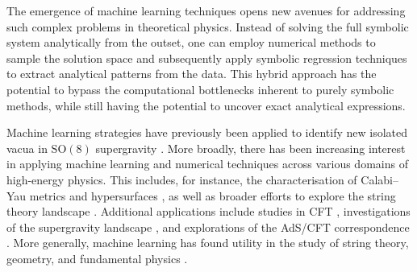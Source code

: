 \documentclass[11pt,a4paper]{article}
\begin{document}
The emergence of machine learning techniques opens new avenues for addressing such complex problems in theoretical physics. Instead of solving the full symbolic system analytically from the outset, one can employ numerical methods to sample the solution space and subsequently apply symbolic regression techniques to extract analytical patterns from the data. This hybrid approach has the potential to bypass the computational bottlenecks inherent to purely symbolic methods, while still having the potential to uncover exact analytical expressions.

Machine learning strategies have previously been applied to identify new isolated vacua in $\mathrm{SO}(8)$ supergravity \cite{Comsa:2019rcz,Berman:2022jqn}. More broadly, there has been increasing interest in applying machine learning and numerical techniques across various domains of high-energy physics. This includes, for instance, the characterisation of Calabi–Yau metrics and hypersurfaces \cite{Ashmore:2019wzb,Berman:2021mcw,Larfors:2022nep,Berglund:2022gvm,Jejjala:2020wcc,Douglas:2006rr,Larfors:2021pbb,He:2018jtw}, as well as broader efforts to explore the string theory landscape \cite{He:2017aed,Carifio:2017bov,Ruehle:2017mzq}. Additional applications include studies in CFT \cite{Chen:2020dxg}, investigations of the supergravity landscape \cite{Brady:2025zzi,Krishnan:2020sfg}, and explorations of the AdS/CFT correspondence \cite{Hashimoto:2018ftp}. More generally, machine learning has found utility in the study of string theory, geometry, and fundamental physics \cite{Ruehle:2020jrk,He:2023csq,Bao:2021auj}.
\end{document}
